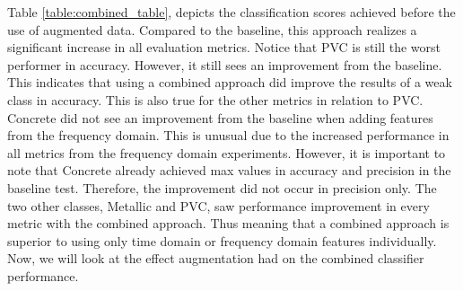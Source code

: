 Table \ref{table:combined_table}, depicts the classification scores achieved before the use of augmented data. Compared to the baseline, this approach realizes a significant increase in all evaluation metrics. Notice that PVC is still the worst performer in accuracy. However, it still sees an improvement from the baseline. This indicates that using a combined approach did improve the results of a weak class in accuracy. This is also true for the other metrics in relation to PVC. Concrete did not see an improvement from the baseline when adding features from the frequency domain. This is unusual due to the increased performance in all metrics from the frequency domain experiments. However, it is important to note that Concrete already achieved max values in accuracy and precision in the baseline test. Therefore, the improvement did not occur in precision only. The two other classes, Metallic and PVC, saw performance improvement in every metric with the combined approach. Thus meaning that a combined approach is superior to using only time domain or frequency domain features individually. Now, we will look at the effect augmentation had on the combined classifier performance.  

